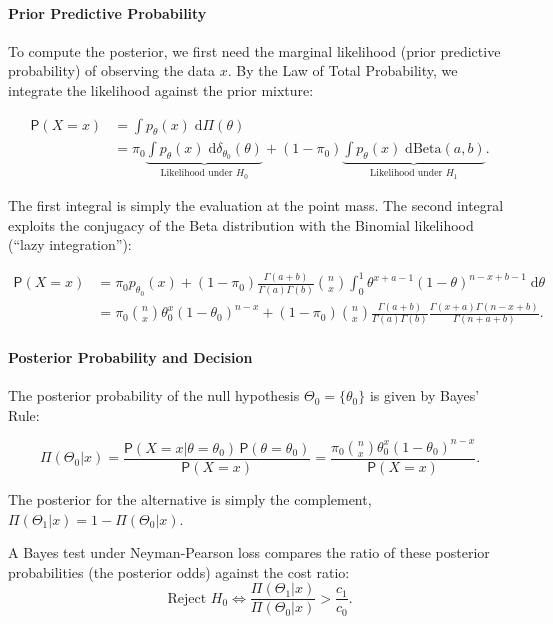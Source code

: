 \begin{ex}
\paragraph{Prior Predictive Probability}
To compute the posterior, we first need the marginal likelihood (prior predictive probability) of observing the data \(x\). By the Law of Total Probability, we integrate the likelihood against the prior mixture:

\[
\begin{split} 
\mathsf{P}(X=x) &= \int p_{\theta}(x) \; \mathrm{d}\Pi(\theta) \\ 
&= \pi_0 \underbrace{\int p_{\theta}(x) \; \mathrm{d}\delta_{\theta_0}(\theta)}_{\text{Likelihood under } H_0} + (1-\pi_0) \underbrace{\int p_{\theta}(x) \; \mathrm{d}\mathrm{Beta}(a,b)}_{\text{Likelihood under } H_1}.
\end{split}
\]

The first integral is simply the evaluation at the point mass. The second integral exploits the conjugacy of the Beta distribution with the Binomial likelihood (``lazy integration''):

\[
\begin{split}
\mathsf{P}(X=x) &= \pi_0 p_{\theta_0}(x) + (1-\pi_0) \frac{\Gamma(a+b)}{\Gamma(a)\Gamma(b)} \binom{n}{x} \int_0^1 \theta^{x+a-1} (1-\theta)^{n-x+b-1} \; \mathrm{d}\theta \\ 
&= \pi_0 \binom{n}{x} \theta_0^x (1-\theta_0)^{n-x} + (1-\pi_0) \binom{n}{x} \frac{\Gamma(a+b)}{\Gamma(a)\Gamma(b)} \frac{\Gamma(x+a)\Gamma(n-x+b)}{\Gamma(n+a+b)}. 
\end{split}
\]

\paragraph{Posterior Probability and Decision}
The posterior probability of the null hypothesis \(\Theta_0 = \{\theta_0\}\) is given by Bayes' Rule:

\[
\Pi(\Theta_0|x) = \frac{\mathsf{P}(X = x | \theta = \theta_0) \, \mathsf{P}(\theta = \theta_0)}{\mathsf{P}(X = x)} 
= \frac{\pi_0\binom{n}{x}\theta_0^x (1 - \theta_0)^{n-x}}{\mathsf{P}(X = x)}.
\]

The posterior for the alternative is simply the complement, \(\Pi(\Theta_1|x)=1-\Pi(\Theta_0|x)\).

A Bayes test under Neyman-Pearson loss compares the ratio of these posterior probabilities (the posterior odds) against the cost ratio:
\[
\text{Reject } H_0 \iff \frac{\Pi(\Theta_1|x)}{\Pi(\Theta_0|x)} > \frac{c_1}{c_0}.
\]

\end{ex}

